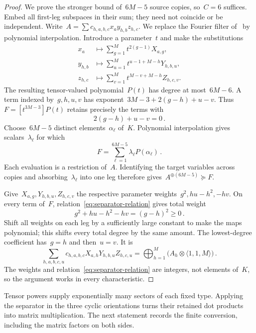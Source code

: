 \documentclass[11pt,letterpaper]{article}
\theoremstyle{definition}
\numberwithin{equation}{section}
\newcommand{\res}{\succeq}
\begin{document}
\begin{proof}
We prove the stronger bound of~$6M-5$ source copies, so~$C=6$ suffices. Embed all first-leg subspaces in their sum; they need not coincide or be independent. Write~$A=\sum c_{h,a,b,c}x_a y_{h,b}z_{h,c}$. We replace the Fourier filter of~\cite[Proposition 3.1]{OpenAI} by polynomial interpolation. Introduce a parameter~$t$ and make the substitutions
\begin{align*}
 x_a&\longmapsto\sum_{g=1}^M t^{2(g-1)}X_{a,g},\\
 y_{h,b}&\longmapsto\sum_{u=1}^M t^{u-1+M-h}Y_{h,b,u},\\
 z_{h,c}&\longmapsto\sum_{v=1}^M t^{M-v+M-h}Z_{h,c,v}.
\end{align*}
The resulting tensor-valued polynomial~$P(t)$ has degree at most~$6M-6$. A term indexed by~$g,h,u,v$ has exponent~$3M-3+2(g-h)+u-v$. Thus~$F=[t^{3M-3}]P(t)$ retains precisely the terms with
\begin{equation}\label{eq:separator-relation}
 2(g-h)+u-v=0\,.
\end{equation}
Choose~$6M-5$ distinct elements~$\alpha_\ell$ of~$K$. Polynomial interpolation gives scalars~$\lambda_\ell$ for which
\begin{equation*}
 F=\sum_{\ell=1}^{6M-5}\lambda_\ell P(\alpha_\ell)\,.
\end{equation*}
Each evaluation is a restriction of~$A$. Identifying the target variables across copies and absorbing~$\lambda_\ell$ into one leg therefore gives~$A^{\oplus(6M-5)}\res F$.

Give~$X_{a,g},Y_{h,b,u},Z_{h,c,v}$ the respective parameter weights~$g^2,hu-h^2,-hv$. On every term of~$F$, relation~\eqref{eq:separator-relation} gives total weight
\begin{equation*}
 g^2+hu-h^2-hv=(g-h)^2\geq0\,.
\end{equation*}
Shift all weights on each leg by a sufficiently large constant to make the maps polynomial; this shifts every total degree by the same amount. The lowest-degree coefficient has~$g=h$ and then~$u=v$. It is
\begin{equation*}
 \sum_{h,a,b,c,u}c_{h,a,b,c}X_{a,h}Y_{h,b,u}Z_{h,c,u}
 =\bigoplus_{h=1}^M\bigl(A_h\otimes \langle1,1,M\rangle\bigr)\,.
\end{equation*}
The weights and relation~\eqref{eq:separator-relation} are integers, not elements of~$K$, so the argument works in every characteristic.
\end{proof}

Tensor powers supply exponentially many sectors of each fixed type. Applying the separator in the three cyclic orientations turns their retained dot products into matrix multiplication. The next statement records the finite conversion, including the matrix factors on both sides.
\end{document}
